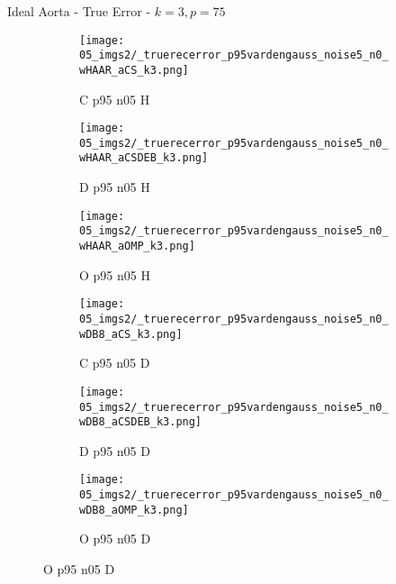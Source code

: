 \begin{frame}{Ideal Aorta - True Error - $k=3,p=75$}{}
\begin{figure}
\begin{subfigure}{0.13\textwidth}
\texttt{[image: 05\_imgs2/\_truerecerror\_p95vardengauss\_noise5\_n0\_wHAAR\_aCS\_k3.png]}
\caption*{\tiny C p95 n05 H}
\end{subfigure}
\begin{subfigure}{0.13\textwidth}
\texttt{[image: 05\_imgs2/\_truerecerror\_p95vardengauss\_noise5\_n0\_wHAAR\_aCSDEB\_k3.png]}
\caption*{\tiny D p95 n05 H}
\end{subfigure}
\begin{subfigure}{0.13\textwidth}
\texttt{[image: 05\_imgs2/\_truerecerror\_p95vardengauss\_noise5\_n0\_wHAAR\_aOMP\_k3.png]}
\caption*{\tiny O p95 n05 H}
\end{subfigure}
\begin{subfigure}{0.13\textwidth}
\texttt{[image: 05\_imgs2/\_truerecerror\_p95vardengauss\_noise5\_n0\_wDB8\_aCS\_k3.png]}
\caption*{\tiny C p95 n05 D}
\end{subfigure}
\begin{subfigure}{0.13\textwidth}
\texttt{[image: 05\_imgs2/\_truerecerror\_p95vardengauss\_noise5\_n0\_wDB8\_aCSDEB\_k3.png]}
\caption*{\tiny D p95 n05 D}
\end{subfigure}
\begin{subfigure}{0.13\textwidth}
\texttt{[image: 05\_imgs2/\_truerecerror\_p95vardengauss\_noise5\_n0\_wDB8\_aOMP\_k3.png]}
\caption*{\tiny O p95 n05 D}
\end{subfigure}

\vspace{5pt}


\end{figure}
\end{frame}

